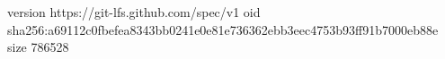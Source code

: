 version https://git-lfs.github.com/spec/v1
oid sha256:a69112c0fbefea8343bb0241e0e81e736362ebb3eec4753b93ff91b7000eb88e
size 786528
